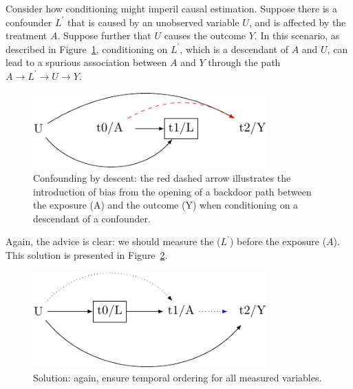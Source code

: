 \documentclass[
  singlecolumn]{article}
\begin{document}
Consider how conditioning might imperil causal estimation. Suppose there
is a confounder \(L^\prime\) that is caused by an unobserved variable
\(U\), and is affected by the treatment \(A\). Suppose further that
\(U\) causes the outcome \(Y\). In this scenario, as described in
Figure~\ref{fig-dag-descendent}, conditioning on \(L^\prime\), which is
a descendant of \(A\) and \(U\), can lead to a spurious association
between \(A\) and \(Y\) through the path \(A \to L^\prime \to U \to Y\).

\begin{figure}

{\centering \includegraphics[width=0.8\textwidth,height=\textheight]{causal-dags_files/figure-pdf/fig-dag-descendent-1.pdf}

}

\caption{\label{fig-dag-descendent}Confounding by descent: the red
dashed arrow illustrates the introduction of bias from the opening of a
backdoor path between the exposure (A) and the outcome (Y) when
conditioning on a descendant of a confounder.}

\end{figure}

Again, the advice is clear: we should measure the (\(L^\prime\)) before
the exposure (\(A\)). This solution is presented in
Figure~\ref{fig-dag-descendent-solution}.

\begin{figure}

{\centering \includegraphics[width=0.8\textwidth,height=\textheight]{causal-dags_files/figure-pdf/fig-dag-descendent-solution-1.pdf}

}

\caption{\label{fig-dag-descendent-solution}Solution: again, ensure
temporal ordering for all measured variables.}

\end{figure}
\end{document}
